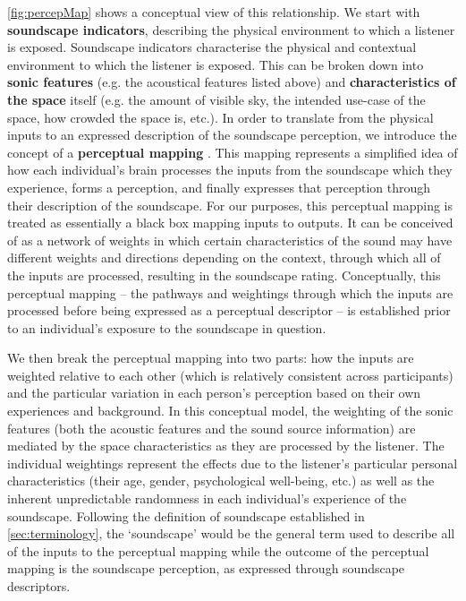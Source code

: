 \cref{fig:percepMap} shows a conceptual view of this relationship. We start with \textbf{soundscape indicators}, describing the physical environment to which a listener is exposed. Soundscape indicators characterise the physical and contextual environment to which the listener is exposed. This can be broken down into \textbf{sonic features} (e.g. the acoustical features listed above) and \textbf{characteristics of the space} itself (e.g. the amount of visible sky, the intended use-case of the space, how crowded the space is, etc.). In order to translate from the physical inputs to an expressed description of the soundscape perception, we introduce the concept of a \textbf{perceptual mapping} \citep{Lionello2021Thesis}. This mapping represents a simplified idea of how each individual's brain processes the inputs from the soundscape which they experience, forms a perception, and finally expresses that perception through their description of the soundscape. For our purposes, this perceptual mapping is treated as essentially a black box mapping inputs to outputs. It can be conceived of as a network of weights in which certain characteristics of the sound may have different weights and directions depending on the context, through which all of the inputs are processed, resulting in the soundscape rating. Conceptually, this perceptual mapping -- the pathways and weightings through which the inputs are processed before being expressed as a perceptual descriptor -- is established prior to an individual's exposure to the soundscape in question.

We then break the perceptual mapping into two parts: how the inputs are weighted relative to each other (which is relatively consistent across participants) and the particular variation in each person's perception based on their own experiences and background. In this conceptual model, the weighting of the sonic features (both the acoustic features and the sound source information) are mediated by the space characteristics as they are processed by the listener. The individual weightings represent the effects due to the listener's particular personal characteristics (their age, gender, psychological well-being, etc.) as well as the inherent unpredictable randomness in each individual's experience of the soundscape.  Following the definition of soundscape established in \cref{sec:terminology}, the `soundscape' would be the general term used to describe all of the inputs to the perceptual mapping while the outcome of the perceptual mapping is the soundscape perception, as expressed through soundscape descriptors.

